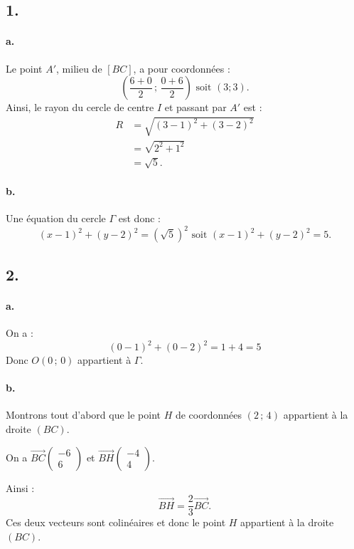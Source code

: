 \subsection*{1.}

\paragraph{a.} Le point \( A' \), milieu de \([BC]\), a pour coordonnées :
\[
\left( \dfrac{6 + 0}{2} \,;\, \dfrac{0 + 6}{2} \right) \text{ soit } (3 ; 3).
\]
Ainsi, le rayon du cercle de centre \( I \) et passant par \( A' \) est :
\begin{align*}
R &= \sqrt{(3 - 1)^2 + (3 - 2)^2} \\
&= \sqrt{2^2 + 1^2} \\
&= \sqrt{5}.
\end{align*}

\paragraph{b.} Une équation du cercle \( \Gamma \) est donc :
\[
(x - 1)^2 + (y - 2)^2 = (\sqrt{5})^2 \text{ soit } (x - 1)^2 + (y - 2)^2 = 5.
\]

\subsection*{2.}

\paragraph{a.} On a : 
\[
(0 - 1)^2 + (0 - 2)^2 = 1 + 4 = 5
\]
Donc \( O(0\,;\,0) \) appartient à \( \Gamma \).

\paragraph{b.} Montrons tout d'abord que le point \( H \) de coordonnées \( (2\,;\,4) \) appartient à la droite \( (BC) \).  

On a \( \overrightarrow{BC} \begin{pmatrix} -6 \\ 6 \end{pmatrix} \) et \( \overrightarrow{BH} \begin{pmatrix} -4 \\ 4 \end{pmatrix} \).

Ainsi :
\[
\overrightarrow{BH} = \dfrac{2}{3} \overrightarrow{BC}.
\]
Ces deux vecteurs sont colinéaires et donc le point \( H \) appartient à la droite \( (BC) \).

